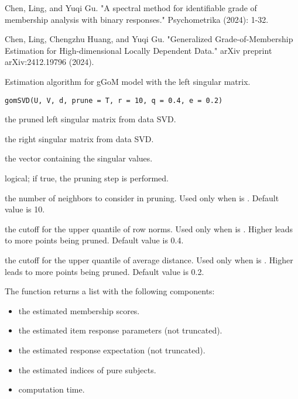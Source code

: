 \documentclass[a4paper]{book}
\begin{document}
%
\begin{References}
Chen, Ling, and Yuqi Gu. "A spectral method for identifiable grade of membership analysis with binary responses." Psychometrika (2024): 1-32.

Chen, Ling, Chengzhu Huang, and Yuqi Gu. "Generalized Grade-of-Membership Estimation for High-dimensional Locally Dependent Data." arXiv preprint arXiv:2412.19796 (2024).
\end{References}
%
\begin{Description}
Estimation algorithm for gGoM model with the left singular matrix.
\end{Description}
%
\begin{Usage}
\begin{verbatim}
gomSVD(U, V, d, prune = T, r = 10, q = 0.4, e = 0.2)
\end{verbatim}
\end{Usage}
%
\begin{Arguments}
\begin{ldescription}
\item[\code{U}] the pruned left singular matrix from data SVD.

\item[\code{V}] the right singular matrix from data SVD.

\item[\code{d}] the vector containing the singular values.

\item[\code{prune}] logical; if true, the pruning step is performed.

\item[\code{r}] the number of neighbors to consider in pruning. Used only when  is . Default value is 10.

\item[\code{q}] the cutoff for the upper quantile of row norms. Used only when  is . Higher  leads to more points being pruned. Default value is 0.4.

\item[\code{e}] the cutoff for the upper quantile of average distance. Used only when  is . Higher  leads to more points being pruned. Default value is 0.2.
\end{ldescription}
\end{Arguments}
%
\begin{Value}
The function returns a list with the following components:
\begin{itemize}

\item{}  the estimated membership scores.
\item{}  the estimated item response parameters (not truncated).
\item{}  the estimated response expectation (not truncated).
\item{}  the estimated indices of pure subjects.
\item{}  computation time.

\end{itemize}

\end{Value}
\end{document}
